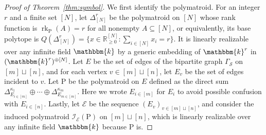 \documentclass{amsart}
\newcommand{\RR}{\mathbb R}
\newcommand{\kk}{\mathbbm{k}}
\renewcommand{\P}{\mathrm{P}}
\newcommand{\rk}{\operatorname{rk}}
\theoremstyle{plain}
\theoremstyle{definition}
\begin{document}
\begin{proof}[Proof of Theorem~\ref{thm:symbol}]
We first identify the polymatroid.
For an integer $r$ and a finite set $[N]$, let $\Delta_{[N]}^r$ be the polymatroid on $[N]$ whose rank function is $\rk_\P(A) = r$ for all nonempty $A\subseteq [N]$, or equivalently, its base polytope is $Q(\Delta^r_{[N]}) = \{ x\in \RR_{\geq 0}^{[N]} : \sum_{i\in {[N]}} x_i = r\}$.  It is linearly realizable over any infinite field $\kk$ by a generic embedding of $\kk^r$ in $(\kk^r)^{\oplus [N]}$.
Let $E$ be the set of edges of the bipartite graph $\Gamma_{\mathcal S}$ on $[m]\sqcup [n]$, and for each vertex $v\in [m]\sqcup [n]$, let $E_v$ be the set of edges incident to $v$.
Let $\P$ be the polymatroid on $E$ defined as the direct sum $\Delta^{\kappa_1}_{E_{i\in [m]}} \oplus \dotsb \oplus \Delta^{\kappa_m}_{E_{m\in [m]}}$.
Here we wrote $E_{i\in[m]}$ for $E_i$ to avoid possible confusion with $E_{i\in [n]}$.
Lastly, let $\mathcal E$ be the sequence $(E_v)_{v\in [m]\sqcup [n]}$, and consider the induced polymatroid $\mathcal I_{\mathcal E}(\P)$ on $[m]\sqcup [n]$, which is linearly realizable over any infinite field $\kk$ because $\P$ is.



\end{proof}
\end{document}
